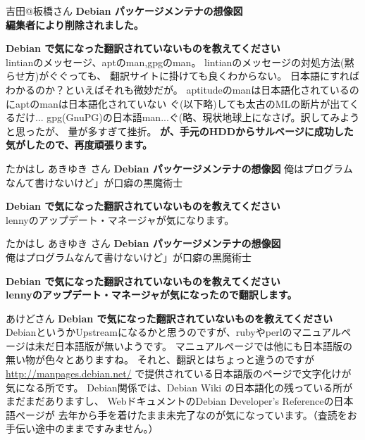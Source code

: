 \documentclass[cjk,dvipdfmx,12pt]{beamer}
\begin{document}
\begin{frame}{吉田@板橋さん}
\textbf{Debian パッケージメンテナの想像図}\\
\textbf{編集者により削除されました。}

\textbf{Debian で気になった翻訳されていないものを教えてください}\\
lintianのメッセージ、aptのman,gpgのman。
lintianのメッセージの対処方法(黙らせ方)がぐぐっても、
翻訳サイトに掛けても良くわからない。
日本語にすればわかるのか？といえばそれも微妙だが。
aptitudeのmanは日本語化されているのにaptのmanは日本語化されていない
ぐ(以下略)しても太古のMLの断片が出てくるだけ...
gpg(GnuPG)の日本語man...ぐ(略、現状地球上になさげ。訳してみようと思ったが、
量が多すぎて挫折。
\textbf{が、手元のHDDからサルベージに成功した気がしたので、再度頑張ります。}
\end{frame}

\begin{frame}{たかはし あきゆき さん}
\textbf{Debian パッケージメンテナの想像図}
俺はプログラムなんて書けないけど」が口癖の黒魔術士

\textbf{Debian で気になった翻訳されていないものを教えてください}\\
lennyのアップデート・マネージャが気になります。
\end{frame}

\begin{frame}{たかはし あきゆき さん}
\textbf{Debian パッケージメンテナの想像図}\\
俺はプログラムなんて書けないけど」が口癖の黒魔術士

\textbf{Debian で気になった翻訳されていないものを教えてください}\\
\textbf{lennyのアップデート・マネージャが気になったので翻訳します。}
\end{frame}

\begin{frame}{あけどさん}
\textbf{Debian で気になった翻訳されていないものを教えてください}\\
DebianというかUpstreamになるかと思うのですが、rubyやperlのマニュアルページは未だ日本語版が無いようです。
マニュアルページでは他にも日本語版の無い物が色々とありますね。
それと、翻訳とはちょっと違うのですが
\url{http://manpages.debian.net/} で提供されている日本語版のページで文字化けが気になる所です。
Debian関係では、Debian Wiki の日本語化の残っている所がまだまだありますし、
WebドキュメントのDebian Developer's Referenceの日本語ページが
去年から手を着けたまま未完了なのが気になっています。（査読をお手伝い途中のままですみません。）
\end{frame}
\end{document}
